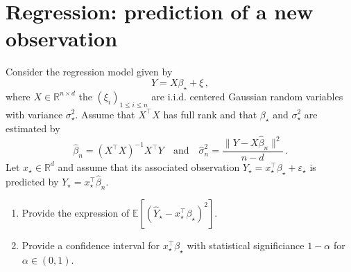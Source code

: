 \documentclass[a4paper,10pt,fleqn]{article}
\newcommand{\eqsp}{\,}
\newcommand{\rset}{\ensuremath{\mathbb{R}}}
\newcommand{\1}{\ensuremath{\mathbbm{1}}}
\newcommand{\bE}{\mathbb{E}}
\begin{document}
\section*{Regression: prediction of a new observation}
Consider the regression model given by
$$
Y = X\beta_{\star}+ \xi\eqsp,
$$
where $X\in\rset^{n\times d}$ the $(\xi_{i})_{1\leqslant i \leqslant n}$ are i.i.d. centered Gaussian random variables with variance $\sigma_{\star}^2$. Assume that $X^\top X$ has full rank and that $\beta_\star$ and $\sigma_{\star}^2$ are estimated by 
$$
\widehat \beta_n = (X^\top X)^{-1}X^\top Y\quad\mathrm{and}\quad \widehat \sigma^2_n =\frac{\|Y - X\widehat \beta_n \|^2}{n-d}\eqsp.
$$
Let $x_\star \in\rset^d$ and assume that its associated observation $Y_\star = x_\star^\top\beta_\star + \varepsilon_\star$ is predicted by $\widehat Y_\star = x_\star^\top\widehat \beta_n$.
\begin{enumerate}
\item  Provide the expression of $\bE[(\widehat Y_\star - x_\star^\top\beta_\star)^2]$.

%

\item  Provide a confidence interval for $x_\star^\top\beta_\star$ with statistical significiance $1-\alpha$ for $\alpha\in(0,1)$.

%
\end{enumerate}
\end{document}
